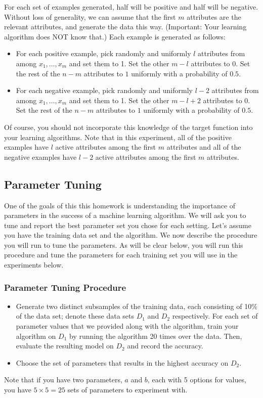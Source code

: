 For each set of examples generated, half will be positive and half
will be negative. Without loss of generality, we can assume that the
first $m$ attributes are the relevant attributes, and generate the
data this way.  (Important: Your learning algorithm does NOT know
that.)  Each example is generated as follows:

\begin{itemize}
\item For each positive example, pick randomly and uniformly $l$
  attributes from among $x_1, \ldots, x_m$ and set them to 1. Set the
  other $m-l$ attributes to 0. Set the rest of the $n-m$ attributes to
  $1$ uniformly with a probability of $0.5$.

\item For each negative example, pick randomly and uniformly $l-2$
  attributes from among $x_1, \ldots, x_m$ and set them to 1. Set the
  other $m-l+2$ attributes to 0. Set the rest of the $n-m$ attributes
  to $1$ uniformly with a probability of $0.5$.
\end{itemize}

Of course, you should not incorporate this knowledge of the target
function into your learning algorithms. Note that in this experiment,
all of the positive examples have $l$ active attributes among the
first $m$ attributes and all of the negative examples have $l-2$
active attributes among the first $m$ attributes.

\subsection*{Parameter Tuning}
One of the goals of this this homework is understanding the importance
of parameters in the success of a machine learning algorithm. We will
ask you to tune and report the best parameter set you chose for each
setting. Let’s assume you have the training data set and the
algorithm. We now describe the procedure you will run to tune the
parameters. As will be clear below, you will run this procedure and
tune the parameters for each training set you will use in the
experiments below.

\subsubsection*{Parameter Tuning Procedure}
\begin{itemize}

\item Generate two distinct subsamples of the training data, each consisting of 
10\% of the data set; denote these data sets $D_1$ and $D_2$
respectively. For each set of parameter values that we provided along
with the algorithm, train your algorithm on $D_1$ by running the
algorithm 20 times over the data. Then, evaluate the resulting model
on $D_2$ and record the accuracy.

\item Choose the set of parameters that results in the highest accuracy on $D_2$.
\end{itemize}
Note that if you have two parameters, $a$ and $b$, each with 5 options
for values, you have $5 \times 5 = 25$ sets of parameters to
experiment with.

